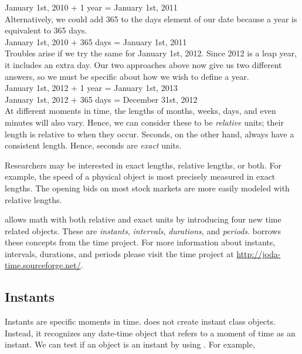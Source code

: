 \documentclass[article]{jss}
\begin{document}
January 1st, 2010 + 1 year = January 1st, 2011\\

Alternatively, we could add 365 to the days element of our date because a year is equivalent to 365 days. \\

January 1st, 2010 + 365 days = January 1st, 2011\\

Troubles arise if we try the same for January 1st, 2012. Since 2012 is a leap year, it includes an extra day. Our two approaches above now give us two different answers, so we must be specific about how we wish to define a year.\\

January 1st, 2012 + 1 year = January 1st, 2013\\
January 1st, 2012 + 365 days = December 31st,  2012\\

At different moments in time, the lengths of months, weeks, days, and even minutes will also vary. Hence, we can consider these to be \emph{relative} units; their length is relative to when they occur. Seconds, on the other hand, always have a consistent length. Hence, seconds are \emph{exact} units.

Researchers may be interested in exact lengths, relative lengths, or both. For example, the speed of a physical object is most precisely measured in exact lengths. The opening bids on most stock markets are more easily modeled with relative lengths.

 allows math with both relative and exact units by introducing four new time related objects. These are \emph{instants}, \emph{intervals}, \emph{durations}, and \emph{periods}.   borrows these concepts from the  time project. For more information about instants, intervals, durations, and periods please visit the  time project at  \url{http://joda-time.sourceforge.net/}. 

\subsection{Instants}
\label{sec:instants}

Instants are specific moments in time.   does not create instant class objects. Instead, it recognizes any date-time object that refers to a moment of time as an instant. We can test if an object is an instant by using . For example,\\
\end{document}

